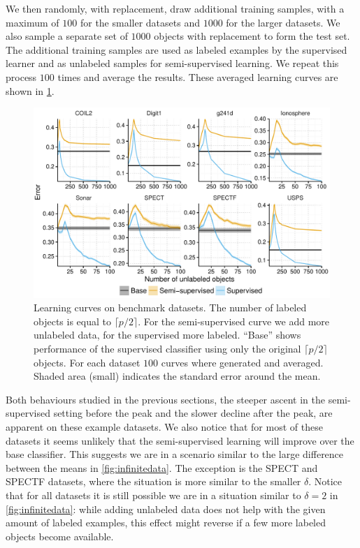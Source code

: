 \documentclass[runningheads,a4paper]{llncs}\usepackage[]{graphicx}\usepackage[]{color}
\makeatletter
\def\maxwidth{ %
  \ifdim\Gin@nat@width>\linewidth
    \linewidth
  \else
    \Gin@nat@width
  \fi
}
\newenvironment{knitrout}{}{} %
\makeatother
\begin{document}
We then randomly, with replacement, draw additional training samples, with a maximum of $100$ for the smaller datasets and $1000$ for the larger datasets. We also sample a separate set of $1000$ objects with replacement to form the test set. The additional training samples are used as labeled examples by the supervised learner and as unlabeled samples for semi-supervised learning. We repeat this process $100$ times and average the results. These averaged learning curves are shown in \cref{fig:benchmark}.

\begin{knitrout}
\color{fgcolor}\begin{figure}
\includegraphics[width=\maxwidth]{figure/benchmark-1} \caption[Learning curves on benchmark datasets]{Learning curves on benchmark datasets. The number of labeled objects is equal to $\lceil p/2 \rceil$. For the semi-supervised curve we add more unlabeled data, for the supervised more labeled. ``Base'' shows performance of the supervised classifier using only the original $\lceil p/2 \rceil$ objects. For each dataset $100$ curves where generated and averaged. Shaded area (small) indicates the standard error around the mean.}\label{fig:benchmark}
\end{figure}


\end{knitrout}

Both behaviours studied in the previous sections, the steeper ascent in the semi-supervised setting before the peak and the slower decline after the peak, are apparent on these example datasets. We also notice that for most of these datasets it seems unlikely that the semi-supervised learning will improve over the base classifier. This suggests we are in a scenario similar to the large difference between the means in \cref{fig:infinitedata}. The exception is the SPECT and SPECTF datasets, where the situation is more similar to the smaller $\delta$. Notice that for all datasets it is still possible we are in a situation similar to $\delta=2$ in \cref{fig:infinitedata}: while adding unlabeled data does not help with the given amount of labeled examples, this effect might reverse if a few more labeled objects become available.
\end{document}
